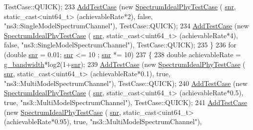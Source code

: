 \begin{DoxyCode}
      TestCase::QUICK);
233       \hyperlink{classns3_1_1TestCase_a3718088e3eefd5d6454569d2e0ddd835}{AddTestCase} (\textcolor{keyword}{new} \hyperlink{classSpectrumIdealPhyTestCase}{SpectrumIdealPhyTestCase} (
      \hyperlink{lte__amc_8m_a7543c5e4e80c828b652e0c63e4a6de70}{snr}, static\_cast<uint64\_t> (achievableRate*2),    \textcolor{keyword}{false},  \textcolor{stringliteral}{"ns3::SingleModelSpectrumChannel"}), 
      TestCase::QUICK);
234       \hyperlink{classns3_1_1TestCase_a3718088e3eefd5d6454569d2e0ddd835}{AddTestCase} (\textcolor{keyword}{new} \hyperlink{classSpectrumIdealPhyTestCase}{SpectrumIdealPhyTestCase} (
      \hyperlink{lte__amc_8m_a7543c5e4e80c828b652e0c63e4a6de70}{snr}, static\_cast<uint64\_t> (achievableRate*4),    \textcolor{keyword}{false},  \textcolor{stringliteral}{"ns3::SingleModelSpectrumChannel"}), 
      TestCase::QUICK);
235     \}
236   \textcolor{keywordflow}{for} (\textcolor{keywordtype}{double} \hyperlink{lte__amc_8m_a7543c5e4e80c828b652e0c63e4a6de70}{snr} = 0.01; \hyperlink{lte__amc_8m_a7543c5e4e80c828b652e0c63e4a6de70}{snr} <= 10 ; \hyperlink{lte__amc_8m_a7543c5e4e80c828b652e0c63e4a6de70}{snr} *= 10)
237     \{          
238       \textcolor{keywordtype}{double} achievableRate = \hyperlink{spectrum-ideal-phy-test_8cc_afbfecc6762036c7df663ddb65ccae7a9}{g\_bandwidth}*log2(1+\hyperlink{lte__amc_8m_a7543c5e4e80c828b652e0c63e4a6de70}{snr});      
239       \hyperlink{classns3_1_1TestCase_a3718088e3eefd5d6454569d2e0ddd835}{AddTestCase} (\textcolor{keyword}{new} \hyperlink{classSpectrumIdealPhyTestCase}{SpectrumIdealPhyTestCase} (
      \hyperlink{lte__amc_8m_a7543c5e4e80c828b652e0c63e4a6de70}{snr}, static\_cast<uint64\_t> (achievableRate*0.1),  \textcolor{keyword}{true},  \textcolor{stringliteral}{"ns3::MultiModelSpectrumChannel"}), 
      TestCase::QUICK);
240       \hyperlink{classns3_1_1TestCase_a3718088e3eefd5d6454569d2e0ddd835}{AddTestCase} (\textcolor{keyword}{new} \hyperlink{classSpectrumIdealPhyTestCase}{SpectrumIdealPhyTestCase} (
      \hyperlink{lte__amc_8m_a7543c5e4e80c828b652e0c63e4a6de70}{snr}, static\_cast<uint64\_t> (achievableRate*0.5),  \textcolor{keyword}{true},  \textcolor{stringliteral}{"ns3::MultiModelSpectrumChannel"}), 
      TestCase::QUICK);
241       \hyperlink{classns3_1_1TestCase_a3718088e3eefd5d6454569d2e0ddd835}{AddTestCase} (\textcolor{keyword}{new} \hyperlink{classSpectrumIdealPhyTestCase}{SpectrumIdealPhyTestCase} (
      \hyperlink{lte__amc_8m_a7543c5e4e80c828b652e0c63e4a6de70}{snr}, static\_cast<uint64\_t> (achievableRate*0.95), \textcolor{keyword}{true},  \textcolor{stringliteral}{"ns3::MultiModelSpectrumChannel"}), 

\end{DoxyCode}
